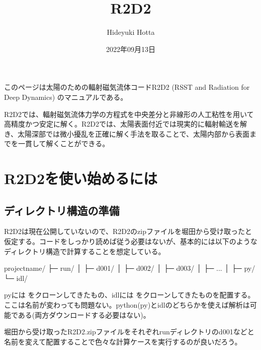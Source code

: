 \documentclass[letterpaper,10pt,dvipdfmx,report]{sphinxmanual}
\title{R2D2}
\date{2022年09月13日}
\author{Hideyuki Hotta}
\let\sphinxpxdimen\pdfpxdimen\else\newdimen\sphinxpxdimen
\begin{document}
\pagestyle{empty}
\sphinxmaketitle
\pagestyle{plain}
\sphinxtableofcontents
\pagestyle{normal}
\label{\detokenize{index::doc}}


\sphinxAtStartPar
このページは太陽のための輻射磁気流体コードR2D2 (RSST and Radiation for Deep Dynamics)
のマニュアルである。

\sphinxAtStartPar
{}

\sphinxAtStartPar
R2D2では、輻射磁気流体力学の方程式を中央差分と非線形の人工粘性を用いて高精度かつ安定に解く。R2D2では、太陽表面付近では現実的に輻射輸送を解き、太陽深部では微小擾乱を正確に解く手法を取ることで、太陽内部から表面までを一貫して解くことができる。

\noindent\sphinxincludegraphics[width=350\sphinxpxdimen]{{R2D2_logo_red}.png}

\sphinxstepscope


\chapter{R2D2を使い始めるには}
\label{\detokenize{start:r2d2}}\label{\detokenize{start::doc}}

\section{ディレクトリ構造の準備}
\label{\detokenize{start:id1}}
\sphinxAtStartPar
R2D2は現在公開していないので、R2D2のzipファイルを堀田から受け取ったと仮定する。コードをしっかり読めば従う必要はないが、基本的には以下のようなディレクトリ構造で計算することを想定している。

\begin{sphinxVerbatim}[commandchars=\\\{\}]
project\PYGZus{}name/
           ├─ run/
           │    ├─ d001/
           │    ├─ d002/
           │    ├─ d003/
           │    ├─ ...
           │
           ├─ py/
           └─ idl/
\end{sphinxVerbatim}

\sphinxAtStartPar
pyには  をクローンしてきたもの、idlには  をクローンしてきたものを配置する。ここは名前が変わっても問題ない。python(py)とidlのどちらかを使えば解析は可能である(両方ダウンロードする必要はない)。

\sphinxAtStartPar
堀田から受け取ったR2D2.zipファイルをそれぞれrunディレクトリのd001などと名前を変えて配置することで色々な計算ケースを実行するのが良いだろう。
\end{document}

